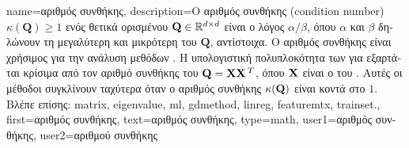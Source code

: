 {name={\foreignlanguage{greek}{αριθμός συνθήκης}},
	description={\foreignlanguage{greek}{O αριθμός συνθήκης} 
		(condition number) $\kappa(\mathbf{Q}) \geq 1$ \foreignlanguage{greek}{ενός θετικά ορισμένου}  
		$\mathbf{Q} \in \mathbb{R}^{d \times d}$ \foreignlanguage{greek}{είναι ο λόγος $\alpha /\beta $, όπου 
		$\alpha$ και $\beta$ δηλώνουν τη μεγαλύτερη και μικρότερη}  \foreignlanguage{greek}{του 
		$\mathbf{Q}$, αντίστοιχα}. \foreignlanguage{greek}{O αριθμός συνθήκης είναι χρήσιμος για την ανάλυση μεθόδων} 
		. \foreignlanguage{greek}{Η υπολογιστική πολυπλοκότητα των}  
		\foreignlanguage{greek}{για}  \foreignlanguage{greek}{εξαρτάται κρίσιμα από τον αριθμό συνθήκης του} 
		 $\mathbf{Q} = {\bf X} {\bf X}\,^{T}$, \foreignlanguage{greek}{όπου} ${\bf X}$ \foreignlanguage{greek}{είναι 
		ο}  \foreignlanguage{greek}{του} . \foreignlanguage{greek}{Αυτές οι μέθοδοι
		συγκλίνουν ταχύτερα όταν ο αριθμός συνθήκης $\kappa(\mathbf{Q})$ είναι κοντά στο} $1$.
		\\
		\foreignlanguage{greek}{Βλέπε επίσης:} \gls{matrix}, \gls{eigenvalue}, \gls{ml}, \gls{gdmethod}, \gls{linreg}, \gls{featuremtx}, 
		\gls{trainset}.},
	first={\foreignlanguage{greek}{αριθμός συνθήκης}},
	text={\foreignlanguage{greek}{αριθμός συνθήκης}},
	type=math, 
	user1={\foreignlanguage{greek}{αριθμός συνθήκης}}, %
	user2={\foreignlanguage{greek}{αριθμού συνθήκης}} %
}


